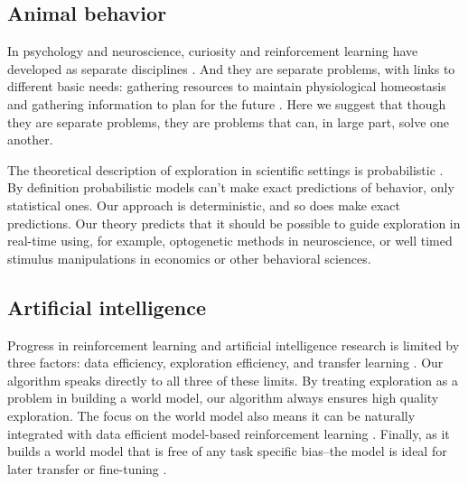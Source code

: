 \documentclass[fleqn,10pt]{wlscirep}
\begin{document}

\subsection*{Animal behavior}
In psychology and neuroscience, curiosity and reinforcement learning have developed as separate disciplines \cite{Berlyne1950,Kidd2015,Sutton2018}. And they are separate problems, with links to different basic needs: gathering resources to maintain physiological homeostasis \cite{Keramati2014,Juechems2019} and gathering information to plan for the future \cite{Valiant1984,Sutton2018}. Here we suggest that though they are separate problems, they are problems that can, in large part, solve one another.

The theoretical description of exploration in scientific settings is probabilistic \cite{Calhoun2014,Song2019a,Gershman2018b,Schulz2018a}. By definition probabilistic models can't make exact predictions of behavior, only statistical ones. Our approach is deterministic, and so does make exact predictions. Our theory predicts that it should be possible to guide exploration in real-time using, for example, optogenetic methods in neuroscience, or well timed stimulus manipulations in economics or other behavioral sciences. 


\subsection*{Artificial intelligence}
Progress in reinforcement learning and artificial intelligence research is limited by three factors: data efficiency, exploration efficiency, and transfer learning \cite{Ha2018}. Our algorithm speaks directly to all three of these limits. By treating exploration as a problem in building a world model, our algorithm always ensures high quality exploration. The focus on the world model also means it can be naturally integrated with data efficient model-based reinforcement learning \cite{Sutton2018,Shyam2018}. Finally, as it builds a world model that is free of any task specific bias--the model is ideal for later transfer or fine-tuning \cite{Yosinski2014,Barreto2018}. 
\end{document}
